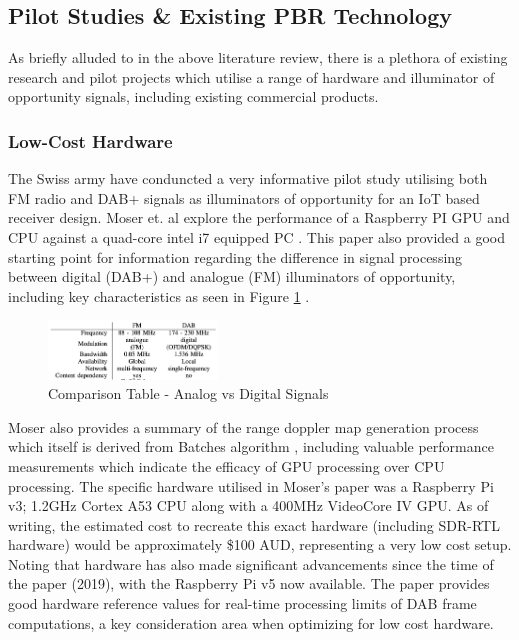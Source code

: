 \documentclass[12pt,a4paper]{article}
\begin{document}
\subsection{Pilot Studies \& Existing PBR Technology}
As briefly alluded to in the above literature review, there is a plethora of existing research and pilot projects which utilise a range of hardware and illuminator of opportunity signals, including existing commercial products.

\subsubsection{Low-Cost Hardware}
The Swiss army have conduncted a very informative pilot study utilising both FM radio and DAB+ signals as illuminators of opportunity for an IoT based receiver design. Moser et. al explore the performance of a Raspberry PI GPU and CPU against a quad-core intel i7 equipped PC \cite{IOTpassiveRadar}. This paper also provided a good starting point for information regarding the difference in signal processing between digital (DAB+) and analogue (FM) illuminators of opportunity, including key characteristics as seen in Figure \ref{fig:signals} . 

\begin{figure}[htbp]
    \centering
    \includegraphics[width=0.4\textwidth]{digAnalog.png}
    \caption{Comparison Table - Analog vs Digital Signals \cite{IOTpassiveRadar}}
    \label{fig:signals}
\end{figure}

\par \vspace{0.5cm} 
\noindent Moser also provides a summary of the range doppler map generation process which itself is derived from Batches algorithm \cite{DSPfm}, including valuable performance measurements which indicate the efficacy of GPU processing over CPU processing.  The specific hardware utilised in Moser's paper was a Raspberry Pi v3; 1.2GHz Cortex A53 CPU along with a 400MHz VideoCore IV GPU. As of writing, the estimated cost to recreate this exact hardware (including SDR-RTL hardware) would be approximately \$100 AUD, representing a very low cost setup. Noting that hardware has also made significant advancements since the time of the paper (2019), with the Raspberry Pi v5 now available. The paper provides good hardware reference values for real-time processing limits of DAB frame computations, a key consideration area when optimizing for low cost hardware. 
\end{document}

